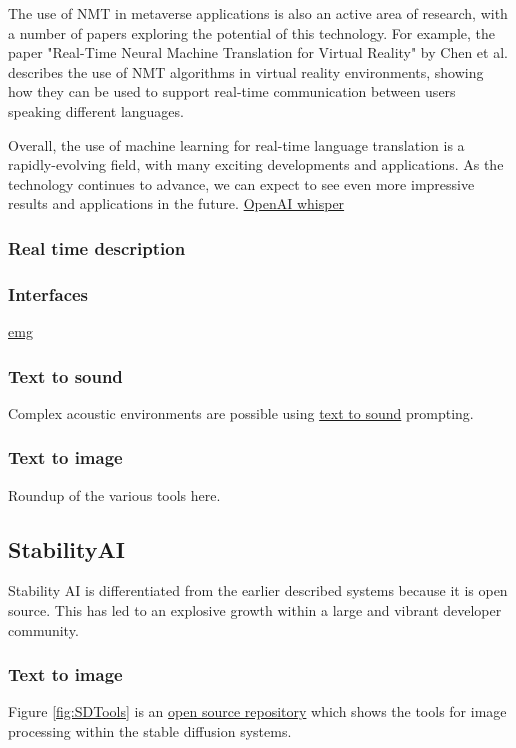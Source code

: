 The use of NMT in metaverse applications is also an active area of research, with a number of papers exploring the potential of this technology. For example, the paper "Real-Time Neural Machine Translation for Virtual Reality" by Chen et al. describes the use of NMT algorithms in virtual reality environments, showing how they can be used to support real-time communication between users speaking different languages.\par
Overall, the use of machine learning for real-time language translation is a rapidly-evolving field, with many exciting developments and applications. As the technology continues to advance, we can expect to see even more impressive results and applications in the future.
\href{https://openai.com/blog/whisper/}{OpenAI whisper}

\subsubsection{Real time description}
\subsubsection{Interfaces}
\href{https://tech.fb.com/ar-vr/2021/03/inside-facebook-reality-labs-wrist-based-interaction-for-the-next-computing-platform/}{emg}
\subsubsection{Text to sound}
Complex acoustic environments are possible using \href{https://anonymous.4open.science/w/iclr2023_samples-CB68/report.html}{text to sound} prompting. 
\subsubsection{Text to image}
Roundup of the various tools here.
\subsection{StabilityAI}
Stability AI is differentiated from the earlier described systems because it is open source. This has led to an explosive growth within a large and vibrant developer community.
\subsubsection{Text to image}
Figure \ref{fig:SDTools} is an \href{https://sdtools.org/}{open source repository} which shows the tools for image processing within the stable diffusion systems.

